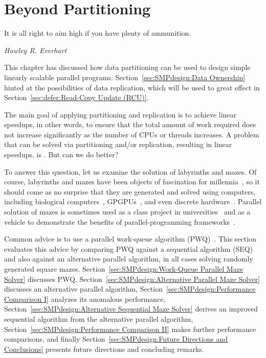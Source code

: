 
\section{Beyond Partitioning}
\label{sec:SMPdesign:Beyond Partitioning}
%
\epigraph{It is all right to aim high if you have plenty of ammunition.}
	 {\emph{Hawley R. Everhart}}

This chapter has discussed how data partitioning can be used to design
simple linearly scalable parallel programs.
Section~\ref{sec:SMPdesign:Data Ownership} hinted at the possibilities
of data replication, which will be used to great effect in
Section~\ref{sec:defer:Read-Copy Update (RCU)}.

The main goal of applying partitioning and replication is to achieve
linear speedups, in other words, to ensure that the total amount of
work required does not increase significantly as the number of CPUs
or threads increases.
A problem that can be solved via partitioning and/or replication,
resulting in linear speedups, is \emph{}.
But can we do better?

To answer this question, let us examine the solution of
labyrinths and mazes.
Of course, labyrinths and mazes have been objects of fascination for
millennia~\cite{WikipediaLabyrinth},
so it should come as no surprise that they are generated and solved
using computers, including biological
computers~\cite{AndrewAdamatzky2011SlimeMold},
GPGPUs~\cite{ChristerEricson2008GPUMaze}, and even
discrete hardware~\cite{MIT:TRMag:MemristorMazes}.
Parallel solution of mazes is sometimes used as a class project in
universities~\cite{ETHZurich:FS2011maze,UMD:CMSC433maze} and
as a vehicle to demonstrate the benefits of parallel-programming
frameworks~\cite{RonFosner2010maze}.

Common advice is to use a parallel work-queue algorithm
(PWQ)~\cite{ETHZurich:FS2011maze,RonFosner2010maze}.
This section evaluates this advice by comparing PWQ
against a sequential algorithm (SEQ) and also against
an alternative parallel algorithm, in all cases solving randomly generated
square mazes.
Section~\ref{sec:SMPdesign:Work-Queue Parallel Maze Solver} discusses PWQ,
Section~\ref{sec:SMPdesign:Alternative Parallel Maze Solver} discusses an alternative
parallel algorithm,
Section~\ref{sec:SMPdesign:Performance Comparison I} analyzes its anomalous performance,
Section~\ref{sec:SMPdesign:Alternative Sequential Maze Solver} derives an improved
sequential algorithm from the alternative parallel algorithm,
Section~\ref{sec:SMPdesign:Performance Comparison II} makes further performance
comparisons,
and finally
Section~\ref{sec:SMPdesign:Future Directions and Conclusions}
presents future directions and concluding remarks.

